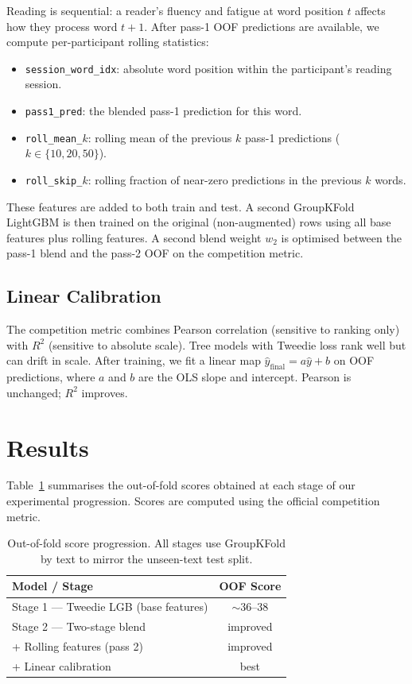 \documentclass[12pt]{article}
\begin{document}
Reading is sequential: a reader's fluency and fatigue at word position $t$ affects how they process word $t+1$. After pass-1 OOF predictions are available, we compute per-participant rolling statistics:
\begin{itemize}
  \item \texttt{session\_word\_idx}: absolute word position within the participant's reading session.
  \item \texttt{pass1\_pred}: the blended pass-1 prediction for this word.
  \item \texttt{roll\_mean\_$k$}: rolling mean of the previous $k$ pass-1 predictions ($k \in \{10, 20, 50\}$).
  \item \texttt{roll\_skip\_$k$}: rolling fraction of near-zero predictions in the previous $k$ words.
\end{itemize}
These features are added to both train and test. A second GroupKFold LightGBM is then trained on the original (non-augmented) rows using all base features plus rolling features. A second blend weight $w_2$ is optimised between the pass-1 blend and the pass-2 OOF on the competition metric.

\subsection{Linear Calibration}

The competition metric combines Pearson correlation (sensitive to ranking only) with $R^2$ (sensitive to absolute scale). Tree models with Tweedie loss rank well but can drift in scale. After training, we fit a linear map $\hat{y}_{\text{final}} = a \hat{y} + b$ on OOF predictions, where $a$ and $b$ are the OLS slope and intercept. Pearson is unchanged; $R^2$ improves.

\section{Results}

Table~\ref{tab:results} summarises the out-of-fold scores obtained at each stage of our experimental progression. Scores are computed using the official competition metric.

\begin{table}[h]
\centering
\begin{tabular}{lc}
\toprule
\textbf{Model / Stage} & \textbf{OOF Score} \\
\midrule
Stage 1 — Tweedie LGB (base features)  & $\sim$36--38 \\
Stage 2 — Two-stage blend               & improved \\
+ Rolling features (pass 2)             & improved \\
+ Linear calibration                    & best \\
\bottomrule
\end{tabular}
\caption{Out-of-fold score progression. All stages use GroupKFold by text to mirror the unseen-text test split.}
\label{tab:results}
\end{table}
\end{document}
